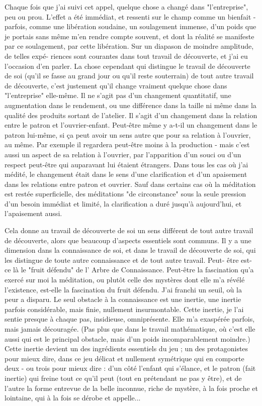 Chaque fois que j'ai suivi cet appel, quelque chose a changé dans "l'entreprise", peu ou prou. L'effet a été immédiat, et ressenti sur le champ comme un bienfait - parfois, comme une libération soudaine, un soulagement immense, d'un poids que je portais sans même m'en rendre compte souvent, et dont la réalité se manifeste par ce soulagement, par cette libération. Sur un diapason de moindre amplitude, de telles expé- riences sont courantes dans tout travail de découverte, et j’ai eu l’occasion d’en parler. La chose cependant qui distingue le travail de découverte de soi (qu'il se fasse au grand jour ou qu'il reste souterrain) de tout autre travail de découverte, c'est justement qu'il change vraiment quelque chose dans "l'entreprise" elle-même. Il ne s'agit pas d'un changement quantitatif, une augmentation dans le rendement, ou une différence dans la taille ni même dans la qualité des produits sortant de l'atelier. Il s'agit d'un changement dans la relation entre le patron et l'ouvrier-enfant. Peut-être même y a-t-il un changement dans le patron lui-même, si ça peut avoir un sens autre que pour sa relation à l'ouvrier, au même. Par exemple il regardera peut-être moins à la production - mais c'est aussi un aspect de sa relation à l'ouvrier, par l'apparition d'un souci ou d'un respect peut-être qui auparavant lui étaient étrangers. Dans tous les cas où j’ai médité, le changement était dans le sens d'une clarification et d'un apaisement dans les relations entre patron et ouvrier. Sauf dans certains cas où la méditation est restée superficielle, des méditations "de circonstance" sous la seule pression d'un besoin immédiat et limité, la clarification a duré jusqu'à aujourd'hui, et l'apaisement aussi.

Cela donne au travail de découverte de soi un sens différent de tout autre travail de découverte, alors que beaucoup d'aspects essentiels sont communs. Il y a une dimension dans la connaissance de soi, et dans le travail de découverte de soi, qui les distingue de toute autre connaissance et de tout autre travail. Peut- être est-ce là le "fruit défendu" de l' Arbre de Connaissance. Peut-être la fascination qu'a exercé sur moi la méditation, ou plutôt celle des mystères dont elle m'a révélé l'existence, est-elle la fascination du fruit défendu. J'ai franchi un seuil, où la peur a disparu. Le seul obstacle à la connaissance est une inertie, une inertie parfois considérable, mais finie, nullement insurmontable. Cette inertie, je l'ai sentie presque à chaque pas, insidieuse, omniprésente. Elle m'a exaspérée parfois, mais jamais découragée. (Pas plus que dans le travail mathématique, où c'est elle aussi qui est le principal obstacle, mais d'un poids incomparablement moindre.) Cette inertie devient un des ingrédients essentiels du jeu ; un des protagonistes pour mieux dire, dans ce jeu délicat et nullement symétrique qui en comporte deux - ou trois pour mieux dire : d'un côté l'enfant qui s'élance, et le patron (fait inertie) qui freine tout ce qu’il peut (tout en prétendant ne pas y être), et de l’autre la forme entrevue de la belle inconnue, riche de mystère, à la fois proche et lointaine, qui à la fois se dérobe et appelle...